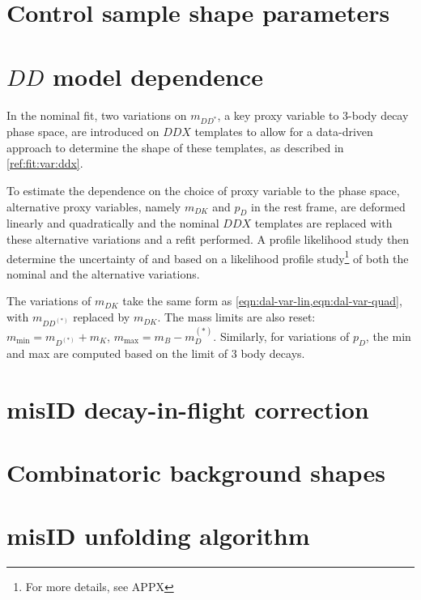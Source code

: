 \section{Control sample shape parameters}
\label{sys-model-ctrl}


\section{$DD$ model dependence}
\label{sys-model-ddx}

In the nominal fit, two variations on $m_{DD^{*}}$,
a key proxy variable to 3-body decay phase space,
are introduced on $DDX$ templates to allow for a data-driven approach to
determine the shape of these templates, as described in
\cref{ref:fit:var:ddx}.

To estimate the dependence on the choice of proxy variable to the phase space,
alternative proxy variables, namely $m_{DK}$ and $p_D$ in the \B rest frame,
are deformed linearly and quadratically and the nominal $DDX$ templates are
replaced with these alternative variations and a refit performed.
A profile likelihood study then determine the uncertainty of \RD and \RDst
based on a likelihood profile study\footnote{
    For more details, see APPX %
} of both the nominal and the alternative variations.

The variations of $m_{DK}$ take the same form as
\cref{eqn:dal-var-lin,eqn:dal-var-quad}, with $m_{DD^{(*)}}$ replaced by
$m_{DK}$.
The mass limits are also reset:
$m_\text{min} = m_{D^{(*)}} + m_K$, $m_\text{max} = m_B - m_D^{(*)}$.
Similarly, for variations of $p_D$, the min and max are computed based on the
limit of 3 body decays.


\section{\muon misID decay-in-flight correction}
\label{sys-model-dif}


\section{Combinatoric background shapes}
\label{sys-model-comb}


\section{\muon misID unfolding algorithm}
\label{sys-algo-misid}


